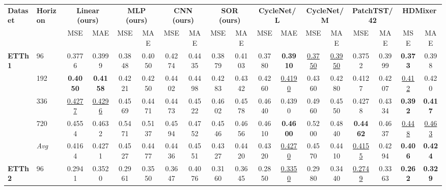 \begin{tabular}{llcccccccccccccccc}
\toprule
\textbf{Dataset} & \textbf{Horizon} & \multicolumn{2}{c}{\textbf{Linear (ours)}} & \multicolumn{2}{c}{\textbf{MLP (ours)}} & \multicolumn{2}{c}{\textbf{CNN (ours)}} & \multicolumn{2}{c}{\textbf{SOR (ours)}} & \multicolumn{2}{c}{\textbf{CycleNet/L}} & \multicolumn{2}{c}{\textbf{CycleNet/M}} & \multicolumn{2}{c}{\textbf{PatchTST/42}} & \multicolumn{2}{c}{\textbf{HDMixer}} \\
\cmidrule(lr){3-4} \cmidrule(lr){5-6} \cmidrule(lr){7-8} \cmidrule(lr){9-10} \cmidrule(lr){11-12} \cmidrule(lr){13-14} \cmidrule(lr){15-16} \cmidrule(lr){17-18}
& & MSE & MAE & MSE & MAE & MSE & MAE & MSE & MAE & MSE & MAE & MSE & MAE & MSE & MAE & MSE & MAE \\
\midrule
\textbf{ETTh1} & 96         &         0.3776 &         0.3999 &         0.3848 &         0.4050 &         0.4274 &         0.4435 &         0.3879 &         0.4103 &         0.3780 & \textbf{0.3910} & \underline{0.3750} & \underline{0.3950} &         0.3752 &         0.3999 & \textbf{0.373} &          0.398 \\
               & 192        & \textbf{0.4050} & \textbf{0.4158} &         0.4221 &         0.4250 &         0.4402 &         0.4498 &         0.4283 &         0.4342 &         0.4260 & \underline{0.4190} &         0.4360 &         0.4280 &         0.4127 &         0.4207 & \underline{0.412} &          0.420 \\
               & 336        & \underline{0.4277} & \underline{0.4296} &         0.4569 &         0.4471 &         0.4473 &         0.4522 &         0.4602 &         0.4578 &         0.4640 &         0.4390 &         0.4960 &         0.4550 &         0.4278 &         0.4334 & \textbf{0.392} & \textbf{0.417} \\
               & 720        &         0.4554 &         0.4632 &         0.5471 &         0.5137 &         0.4594 &         0.4752 &         0.4546 &         0.4656 &         0.4610 & \textbf{0.4600} &         0.5200 &         0.4840 & \textbf{0.4462} &         0.4637 & \underline{0.448} & \underline{0.463} \\
               & \textit{Avg} &         0.4164 &         0.4271 &         0.4527 &         0.4477 &         0.4436 &         0.4551 &         0.4327 &         0.4420 &         0.4320 & \underline{0.4270} &         0.4570 &         0.4410 & \underline{0.4155} &         0.4294 & \textbf{0.406} & \textbf{0.424} \\
\midrule
\textbf{ETTh2} & 96         &         0.2941 &         0.3520 &         0.2961 &         0.3550 &         0.3647 &         0.4076 &         0.3160 &         0.3645 &         0.2850 & \underline{0.3350} &         0.2980 &         0.3440 & \underline{0.2749} &         0.3363 & \textbf{0.262} & \textbf{0.329} \\

\end{tabular}
